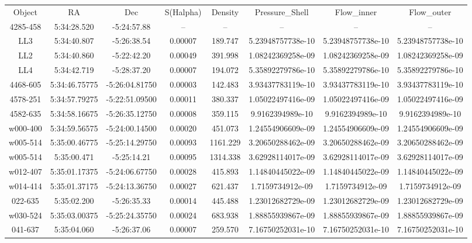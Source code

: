 \begin{table}
\begin{tabular}{cccccccc}
Object & RA & Dec & S(Halpha) & Density & Pressure_Shell & Flow_inner & Flow_outer \\
4285-458 & 5:34:28.520 & -5:24:57.88 & -- & -- & -- & -- & -- \\
LL3 & 5:34:40.807 & -5:26:38.54 & 0.00007 & 189.747 & 5.23948757738e-10 & 5.23948757738e-10 & 5.23948757738e-10 \\
LL2 & 5:34:40.860 & -5:22:42.20 & 0.00049 & 391.998 & 1.08242369258e-09 & 1.08242369258e-09 & 1.08242369258e-09 \\
LL4 & 5:34:42.719 & -5:28:37.20 & 0.00007 & 194.072 & 5.35892279786e-10 & 5.35892279786e-10 & 5.35892279786e-10 \\
4468-605 & 5:34:46.75775 & -5:26:04.81750 & 0.00003 & 142.483 & 3.93437783119e-10 & 3.93437783119e-10 & 3.93437783119e-10 \\
4578-251 & 5:34:57.79275 & -5:22:51.09500 & 0.00011 & 380.337 & 1.05022497416e-09 & 1.05022497416e-09 & 1.05022497416e-09 \\
4582-635 & 5:34:58.16675 & -5:26:35.12750 & 0.00008 & 359.115 & 9.9162394989e-10 & 9.9162394989e-10 & 9.9162394989e-10 \\
w000-400 & 5:34:59.56575 & -5:24:00.14500 & 0.00020 & 451.073 & 1.24554906609e-09 & 1.24554906609e-09 & 1.24554906609e-09 \\
w005-514 & 5:35:00.46775 & -5:25:14.29750 & 0.00093 & 1161.229 & 3.20650288462e-09 & 3.20650288462e-09 & 3.20650288462e-09 \\
w005-514 & 5:35:00.471 & -5:25:14.21 & 0.00095 & 1314.338 & 3.62928114017e-09 & 3.62928114017e-09 & 3.62928114017e-09 \\
w012-407 & 5:35:01.17375 & -5:24:06.67750 & 0.00028 & 415.893 & 1.14840445022e-09 & 1.14840445022e-09 & 1.14840445022e-09 \\
w014-414 & 5:35:01.37175 & -5:24:13.36750 & 0.00027 & 621.437 & 1.7159734912e-09 & 1.7159734912e-09 & 1.7159734912e-09 \\
022-635 & 5:35:02.200 & -5:26:35.33 & 0.00014 & 445.488 & 1.23012682729e-09 & 1.23012682729e-09 & 1.23012682729e-09 \\
w030-524 & 5:35:03.00375 & -5:25:24.35750 & 0.00024 & 683.938 & 1.88855939867e-09 & 1.88855939867e-09 & 1.88855939867e-09 \\
041-637 & 5:35:04.060 & -5:26:37.06 & 0.00007 & 259.570 & 7.16750252031e-10 & 7.16750252031e-10 & 7.16750252031e-10 \\

\end{tabular}
\end{table}

